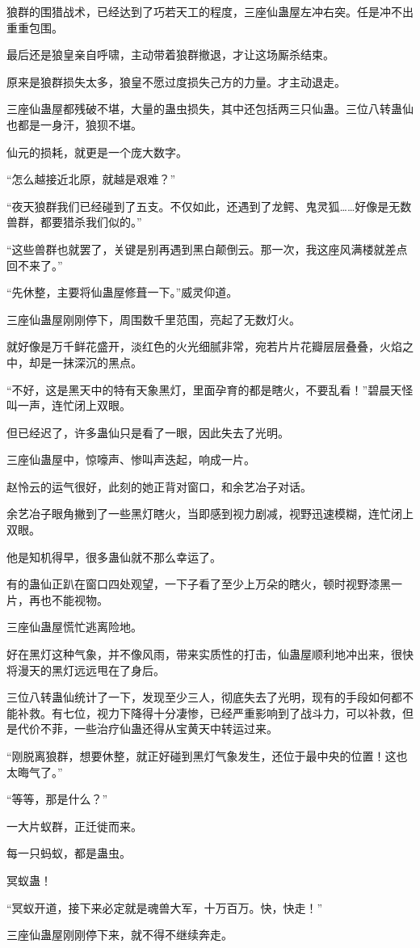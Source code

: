 \begin{this_body}
狼群的围猎战术，已经达到了巧若天工的程度，三座仙蛊屋左冲右突。任是冲不出重重包围。

最后还是狼皇亲自呼啸，主动带着狼群撤退，才让这场厮杀结束。

原来是狼群损失太多，狼皇不愿过度损失己方的力量。才主动退走。

三座仙蛊屋都残破不堪，大量的蛊虫损失，其中还包括两三只仙蛊。三位八转蛊仙也都是一身汗，狼狈不堪。

仙元的损耗，就更是一个庞大数字。

“怎么越接近北原，就越是艰难？”

“夜天狼群我们已经碰到了五支。不仅如此，还遇到了龙鳄、鬼灵狐……好像是无数兽群，都要猎杀我们似的。”

“这些兽群也就罢了，关键是别再遇到黑白颠倒云。那一次，我这座风满楼就差点回不来了。”

“先休整，主要将仙蛊屋修葺一下。”威灵仰道。

三座仙蛊屋刚刚停下，周围数千里范围，亮起了无数灯火。

就好像是万千鲜花盛开，淡红色的火光细腻非常，宛若片片花瓣层层叠叠，火焰之中，却是一抹深沉的黑点。

“不好，这是黑天中的特有天象黑灯，里面孕育的都是瞎火，不要乱看！”碧晨天怪叫一声，连忙闭上双眼。

但已经迟了，许多蛊仙只是看了一眼，因此失去了光明。

三座仙蛊屋中，惊嚎声、惨叫声迭起，响成一片。

赵怜云的运气很好，此刻的她正背对窗口，和余艺冶子对话。

余艺冶子眼角撇到了一些黑灯瞎火，当即感到视力剧减，视野迅速模糊，连忙闭上双眼。

他是知机得早，很多蛊仙就不那么幸运了。

有的蛊仙正趴在窗口四处观望，一下子看了至少上万朵的瞎火，顿时视野漆黑一片，再也不能视物。

三座仙蛊屋慌忙逃离险地。

好在黑灯这种气象，并不像风雨，带来实质性的打击，仙蛊屋顺利地冲出来，很快将漫天的黑灯远远甩在了身后。

三位八转蛊仙统计了一下，发现至少三人，彻底失去了光明，现有的手段如何都不能补救。有七位，视力下降得十分凄惨，已经严重影响到了战斗力，可以补救，但是代价不菲，一些治疗仙蛊还得从宝黄天中转运过来。

“刚脱离狼群，想要休整，就正好碰到黑灯气象发生，还位于最中央的位置！这也太晦气了。”

“等等，那是什么？”

一大片蚁群，正迁徙而来。

每一只蚂蚁，都是蛊虫。

冥蚁蛊！

“冥蚁开道，接下来必定就是魂兽大军，十万百万。快，快走！”

三座仙蛊屋刚刚停下来，就不得不继续奔走。

\end{this_body}

